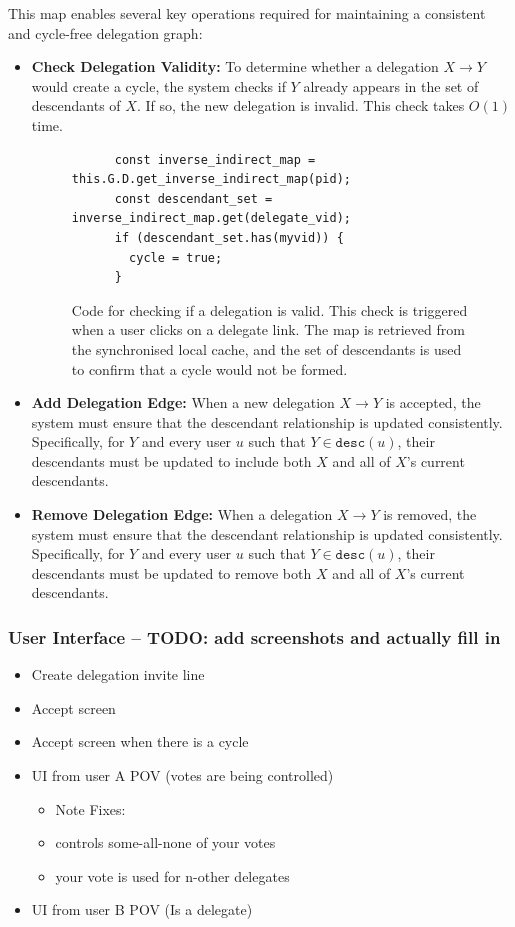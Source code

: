 This map enables several key operations required for maintaining a consistent and cycle-free delegation graph:

\begin{itemize}
  \item \textbf{Check Delegation Validity:} To determine whether a delegation \(X \!\to\! Y\) would create a cycle, the system checks if \(Y\) already appears in the set of descendants of \(X\). If so, the new delegation is invalid. This check takes \(O(1)\) time.
  \begin{figure}[H]
    \centering
    \begin{verbatim}
      const inverse_indirect_map = this.G.D.get_inverse_indirect_map(pid);
      const descendant_set = inverse_indirect_map.get(delegate_vid);
      if (descendant_set.has(myvid)) {
        cycle = true;
      }
    \end{verbatim}
    \caption{Code for checking if a delegation is valid. This check is triggered when a user clicks on a delegate link. The map is retrieved from the synchronised local cache, and the set of descendants is used to confirm that a cycle would not be formed.}
  \end{figure}

  \item \textbf{Add Delegation Edge:} When a new delegation \(X \to Y\) is accepted, the system must ensure that the descendant relationship is updated consistently. Specifically, for $Y$ and every user \(u\) such that \(Y \in \texttt{desc}(u)\), their descendants must be updated to include both \(X\) and all of \(X\)'s current descendants.

  \item \textbf{Remove Delegation Edge:} When a delegation \(X \!\to\! Y\) is removed, the system must ensure that the descendant relationship is updated consistently. Specifically, for $Y$ and every user \(u\) such that \(Y \in \texttt{desc}(u)\), their descendants must be updated to remove both \(X\) and all of \(X\)'s current descendants.
\end{itemize}

\subsubsection{User Interface -- TODO: add screenshots and actually fill in}
\begin{itemize}
\item Create delegation invite line
\item Accept screen
\item Accept screen when there is a cycle
\item UI from user A POV (votes are being controlled)
\begin{itemize}
  \item Note Fixes:
  \item controls some-all-none of your votes
  \item your vote is used for n-other delegates
\end{itemize}
\item UI from user B POV (Is a delegate)
\end{itemize}

